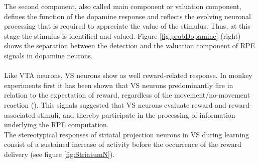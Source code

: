 The second component, also called main component or valuation component, defines the function of the dopamine response and reflects the evolving neuronal processing that is required to appreciate the value of the stimulus. Thus, at this stage the stimulus is identified and valued. Figure \ref{fig:probDopamine} (right) shows the separation between the detection and the valuation component of RPE signals in dopamine neurons.\\\\Like VTA neurons, VS neurons show as well reward-related response. In monkey experiments first it has been shown that VS neurons predominantly fire in relation to the expectation of reward, regardless of the movement/no-movement reaction (\cite{Schultz1992}). This signals suggested that VS neurons evaluate reward and reward-associated stimuli, and thereby participate in the processing of information underlying the RPE computation.\\The stereotypical responses of striatal projection neurons in VS during learning consist of a sustained increase of activity before the occurrence of the reward delivery (see figure \ref{fig:StriatumN}).
